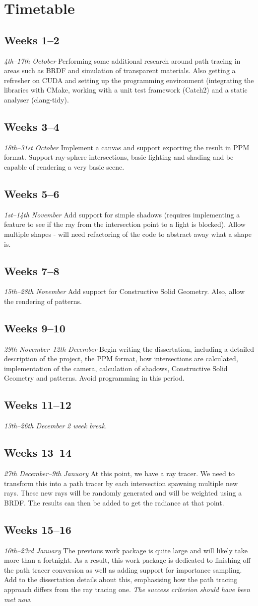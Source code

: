 \documentclass[12pt, a4paper]{article}
\newcommand{\newtime}[3]{
    \subsection*{#1}
    \vspace{-\baselineskip}
    \emph{#2}
    \vspace{\baselineskip}
    \newline
    #3
}
\begin{document}
    \section*{Timetable}
    \newtime{Weeks 1--2}{4th--17th October}{Performing some additional research around path tracing in areas such as BRDF and simulation of transparent materials. Also getting a refresher on CUDA and setting up the programming environment (integrating the libraries with CMake, working with a unit test framework (Catch2) and a static analyser (clang-tidy).}

    \newtime{Weeks 3--4}{18th--31st October}{Implement a canvas and support exporting the result in PPM format. Support ray-sphere intersections, basic lighting and shading and be capable of rendering a very basic scene.}

    \newtime{Weeks 5--6}{1st--14th November}{Add support for simple shadows (requires implementing a feature to see if the ray from the intersection point to a light is blocked). Allow multiple shapes - will need refactoring of the code to abstract away what a shape is.}

    \newtime{Weeks 7--8}{15th--28th November}{Add support for Constructive Solid Geometry. Also, allow the rendering of patterns.}

    \newtime{Weeks 9--10}{29th November--12th December}{Begin writing the dissertation, including a detailed description of the project, the PPM format, how intersections are calculated, implementation of the camera, calculation of shadows, Constructive Solid Geometry and patterns. Avoid programming in this period.}

    \newtime{Weeks 11--12}{13th--26th December}{\emph{2 week break.}}

    \newtime{Weeks 13--14}{27th December--9th January}{At this point, we have a ray tracer. We need to transform this into a path tracer by each intersection spawning multiple new rays. These new rays will be randomly generated and will be weighted using a BRDF. The results can then be added to get the radiance at that point.}

    \newtime{Weeks 15--16}{10th--23rd January}{The previous work package is quite large and will likely take more than a fortnight. As a result, this work package is dedicated to finishing off the path tracer conversion as well as adding support for importance sampling. Add to the dissertation details about this, emphasising how the path tracing approach differs from the ray tracing one. \emph{The success criterion should have been met now.}}
\end{document}
